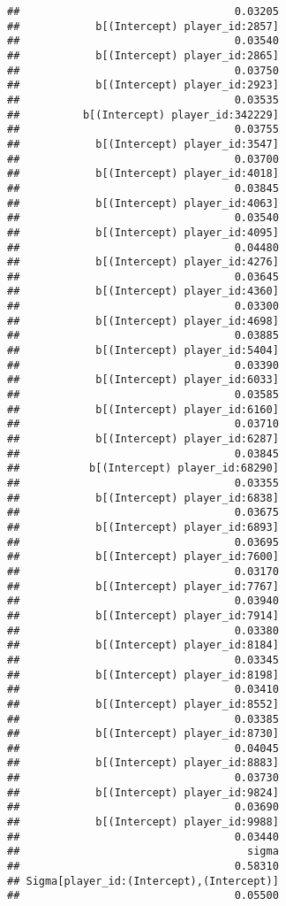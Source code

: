\documentclass[
]{article}
\begin{document}
\begin{verbatim}
##                                  0.03205 
##            b[(Intercept) player_id:2857] 
##                                  0.03540 
##            b[(Intercept) player_id:2865] 
##                                  0.03750 
##            b[(Intercept) player_id:2923] 
##                                  0.03535 
##          b[(Intercept) player_id:342229] 
##                                  0.03755 
##            b[(Intercept) player_id:3547] 
##                                  0.03700 
##            b[(Intercept) player_id:4018] 
##                                  0.03845 
##            b[(Intercept) player_id:4063] 
##                                  0.03540 
##            b[(Intercept) player_id:4095] 
##                                  0.04480 
##            b[(Intercept) player_id:4276] 
##                                  0.03645 
##            b[(Intercept) player_id:4360] 
##                                  0.03300 
##            b[(Intercept) player_id:4698] 
##                                  0.03885 
##            b[(Intercept) player_id:5404] 
##                                  0.03390 
##            b[(Intercept) player_id:6033] 
##                                  0.03585 
##            b[(Intercept) player_id:6160] 
##                                  0.03710 
##            b[(Intercept) player_id:6287] 
##                                  0.03845 
##           b[(Intercept) player_id:68290] 
##                                  0.03355 
##            b[(Intercept) player_id:6838] 
##                                  0.03675 
##            b[(Intercept) player_id:6893] 
##                                  0.03695 
##            b[(Intercept) player_id:7600] 
##                                  0.03170 
##            b[(Intercept) player_id:7767] 
##                                  0.03940 
##            b[(Intercept) player_id:7914] 
##                                  0.03380 
##            b[(Intercept) player_id:8184] 
##                                  0.03345 
##            b[(Intercept) player_id:8198] 
##                                  0.03410 
##            b[(Intercept) player_id:8552] 
##                                  0.03385 
##            b[(Intercept) player_id:8730] 
##                                  0.04045 
##            b[(Intercept) player_id:8883] 
##                                  0.03730 
##            b[(Intercept) player_id:9824] 
##                                  0.03690 
##            b[(Intercept) player_id:9988] 
##                                  0.03440 
##                                    sigma 
##                                  0.58310 
## Sigma[player_id:(Intercept),(Intercept)] 
##                                  0.05500
\end{verbatim}
\end{document}
